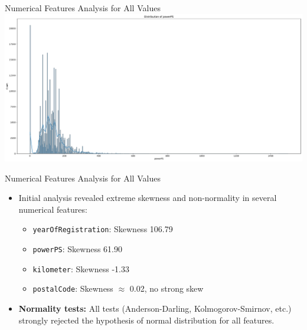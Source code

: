 \documentclass{beamer}
\begin{document}
\begin{frame}{Numerical Features Analysis for All Values}
        \center
\includegraphics[scale=0.2]{powerPS_distribution.pdf}
\end{frame}

\begin{frame}{Numerical Features Analysis for All Values}
        \begin{itemize}
                \item Initial analysis revealed extreme skewness and
                        non-normality in several numerical features:
                        \begin{itemize}
                                \item \texttt{yearOfRegistration}: Skewness
                                        106.79
                                \item \texttt{powerPS}: Skewness 61.90 
                                \item \texttt{kilometer}: Skewness -1.33
                                \item \texttt{postalCode}: Skewness $\approx$
                                        0.02, no strong skew
                        \end{itemize}
                \item \textbf{Normality tests:} All tests (Anderson-Darling,
                        Kolmogorov-Smirnov, etc.) strongly rejected the
                        hypothesis of normal distribution for all features.
        \end{itemize}
\end{frame}
\end{document}
